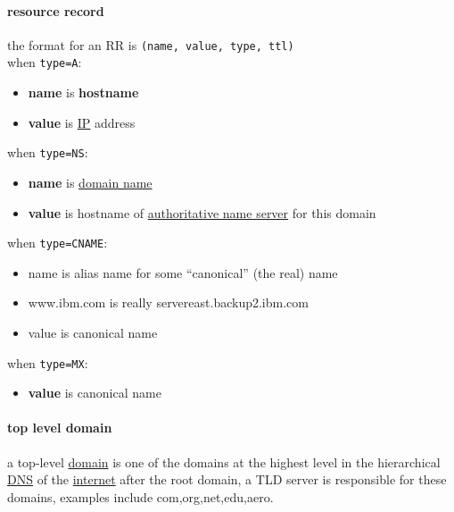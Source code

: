 \documentclass[a4paper,12pt]{article}
\begin{document}
\paragraph{resource record}
\label{sec:orgc8f2b3d}
the format for an RR is \texttt{(name, value, type, ttl)}\\
when \texttt{type=A}:\\
\begin{itemize}
\item \textbf{name} is \textbf{hostname}\\
\item \textbf{value} is \hyperref[sec:org07a120e]{IP} address\\
\end{itemize}
when \texttt{type=NS}:\\
\begin{itemize}
\item \textbf{name} is \hyperref[sec:orga14cc92]{domain name}\\
\item \textbf{value} is hostname of \hyperref[sec:orgdf2cbbe]{authoritative name server} for this domain\\
\end{itemize}
when \texttt{type=CNAME}:\\
\begin{itemize}
\item name is alias name for some “canonical” (the real) name\\
\item www.ibm.com is really servereast.backup2.ibm.com\\
\item value is canonical name\\
\end{itemize}
when \texttt{type=MX}:\\
\begin{itemize}
\item \textbf{value} is canonical name\\
\end{itemize}
\paragraph{top level domain}
\label{sec:org68a2005}
a top-level \href{discrete_maths2.org}{domain} is one of the domains at the highest level in the hierarchical \hyperref[sec:org15194d9]{DNS} of the \hyperref[sec:orga773caf]{internet} after the root domain, a TLD server is responsible for these domains, examples include com,org,net,edu,aero.\\
\end{document}
